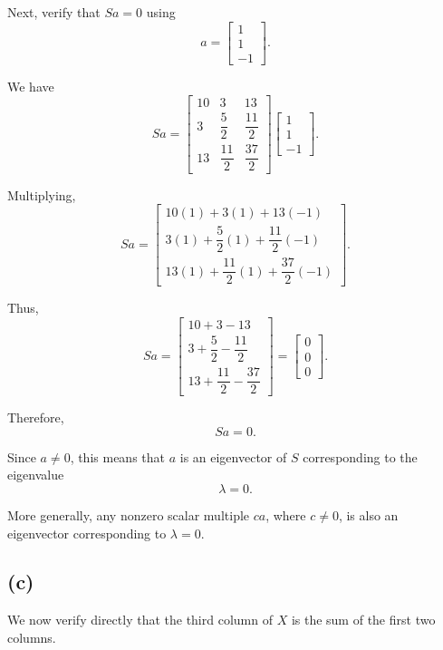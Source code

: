 \documentclass[12pt]{article}
\begin{document}
	Next, verify that \(Sa=0\) using
	\[
	a=
	\begin{bmatrix}
		1\\1\\-1
	\end{bmatrix}.
	\]
	
	We have
	\[
	Sa
	=
	\begin{bmatrix}
		10&3&13\\
		3&\dfrac52&\dfrac{11}{2}\\[5pt]
		13&\dfrac{11}{2}&\dfrac{37}{2}
	\end{bmatrix}
	\begin{bmatrix}
		1\\1\\-1
	\end{bmatrix}.
	\]
	
	Multiplying,
	\[
	Sa
	=
	\begin{bmatrix}
		10(1)+3(1)+13(-1)
		\\[4pt]
		3(1)+\dfrac52(1)+\dfrac{11}{2}(-1)
		\\[4pt]
		13(1)+\dfrac{11}{2}(1)+\dfrac{37}{2}(-1)
	\end{bmatrix}.
	\]
	
	Thus,
	\[
	Sa
	=
	\begin{bmatrix}
		10+3-13\\[4pt]
		3+\dfrac52-\dfrac{11}{2}\\[4pt]
		13+\dfrac{11}{2}-\dfrac{37}{2}
	\end{bmatrix}
	=
	\begin{bmatrix}
		0\\0\\0
	\end{bmatrix}.
	\]
	
	Therefore,
	\[
	\boxed{Sa=0}.
	\]
	
	Since \(a\neq0\), this means that \(a\) is an eigenvector of
	\(S\) corresponding to the eigenvalue
	\[
	\boxed{\lambda=0}.
	\]
	
	More generally, any nonzero scalar multiple \(ca\), where
	\(c\neq0\), is also an eigenvector corresponding to
	\(\lambda=0\).
	
	\subsection*{(c)}
	
	We now verify directly that the third column of \(X\) is the
	sum of the first two columns.
	
\end{document}
